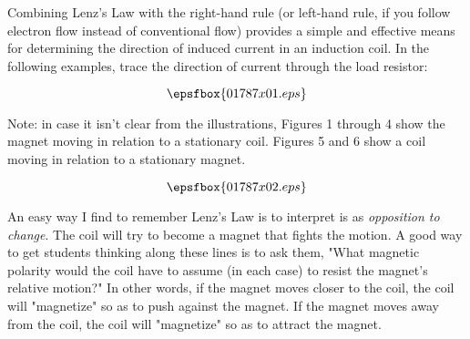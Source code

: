 

Combining Lenz's Law with the right-hand rule (or left-hand rule, if you follow electron flow instead of conventional flow) provides a simple and effective means for determining the direction of induced current in an induction coil.  In the following examples, trace the direction of current through the load resistor:

$$\epsfbox{01787x01.eps}$$







Note: in case it isn't clear from the illustrations, Figures 1 through 4 show the magnet moving in relation to a stationary coil.  Figures 5 and 6 show a coil moving in relation to a stationary magnet.

$$\epsfbox{01787x02.eps}$$







An easy way I find to remember Lenz's Law is to interpret is as {\it opposition to change}.  The coil will try to become a magnet that fights the motion.  A good way to get students thinking along these lines is to ask them, "What magnetic polarity would the coil have to assume (in each case) to resist the magnet's relative motion?"  In other words, if the magnet moves closer to the coil, the coil will "magnetize" so as to push against the magnet.  If the magnet moves away from the coil, the coil will "magnetize" so as to attract the magnet.




